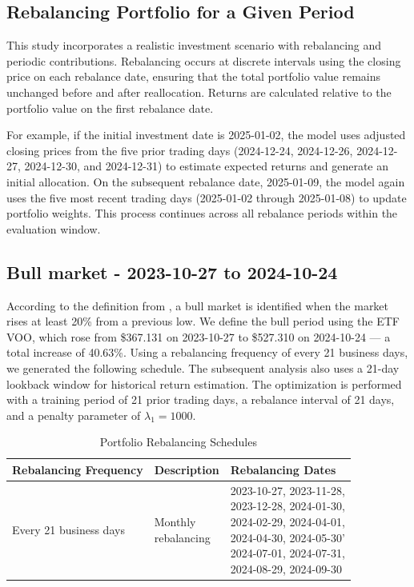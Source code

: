 \documentclass[12pt]{article}
\begin{document}
\subsection{Rebalancing Portfolio for a Given Period}

This study incorporates a realistic investment scenario with rebalancing and periodic contributions. Rebalancing occurs at discrete intervals using the closing price on each rebalance date, ensuring that the total portfolio value remains unchanged before and after reallocation. Returns are calculated relative to the portfolio value on the first rebalance date.

For example, if the initial investment date is 2025-01-02, the model uses adjusted closing prices from the five prior trading days (2024-12-24, 2024-12-26, 2024-12-27, 2024-12-30, and 2024-12-31) to estimate expected returns and generate an initial allocation. On the subsequent rebalance date, 2025-01-09, the model again uses the five most recent trading days (2025-01-02 through 2025-01-08) to update portfolio weights. This process continues across all rebalance periods within the evaluation window.

\subsection{Bull market - 2023-10-27 to 2024-10-24}

According to the definition from \cite{fidelity_bear_bull}, a bull market is identified when the market rises at least 20\% from a previous low. We define the bull period using the ETF VOO, which rose from \$367.131 on 2023-10-27 to \$527.310 on 2024-10-24 — a total increase of 40.63\%. Using a rebalancing frequency of every 21 business days, we generated the following schedule. The subsequent analysis also uses a 21-day lookback window for historical return estimation. The optimization is performed with a training period of 21 prior trading days, a rebalance interval of 21 days, and a penalty parameter of \(\lambda_1 = 1000\).

\begin{table}[H]
\centering
\caption{Portfolio Rebalancing Schedules}
\begin{tabular}{|l|p{4cm}|p{5cm}|}
\hline
\textbf{Rebalancing Frequency} & \textbf{Description} & \textbf{Rebalancing Dates} \\
\hline
Every 21 business days & \makecell[l]{Monthly\\rebalancing} & 
\makecell[l]{
2023-10-27, 2023-11-28,\\
2023-12-28, 2024-01-30,\\
2024-02-29, 2024-04-01,\\
2024-04-30, 2024-05-30'\\
2024-07-01, 2024-07-31,\\
2024-08-29, 2024-09-30
} \\
\hline
\end{tabular}
\label{tab:bull_VOO}
\end{table}
\end{document}
